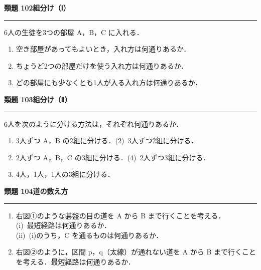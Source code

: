 \documentclass[a4paper,11pt]{ltjsarticle}
\newcommand{\mon}[2]{\Needspace{7\baselineskip}\vspace{10pt}%
  {\sffamily\bfseries 類題 #1\quad #2\par}\vspace{2pt}\hrule\vspace{4pt}}
\begin{document}
\mon{102}{組分け（Ⅰ）}
6人の生徒を3つの部屋 A，B，C に入れる．
\begin{enumerate}
\item 空き部屋があってもよいとき，入れ方は何通りあるか．
\item ちょうど2つの部屋だけを使う入れ方は何通りあるか．
\item どの部屋にも少なくとも1人が入る入れ方は何通りあるか．
\end{enumerate}

\mon{103}{組分け（Ⅱ）}
6人を次のように分ける方法は，それぞれ何通りあるか．
\begin{enumerate}
\item 3人ずつ A，B の2組に分ける．\qquad (2)\ 3人ずつ2組に分ける．
\item[(3)] 2人ずつ A，B，C の3組に分ける．\qquad (4)\ 2人ずつ3組に分ける．
\item[(5)] 4人，1人，1人の3組に分ける．
\end{enumerate}

\mon{104}{道の数え方}
\begin{minipage}[t]{0.6\linewidth}
\begin{enumerate}
\item 右図①のような碁盤の目の道を A から B まで行くことを考える．\\
(i)\ 最短経路は何通りあるか．\\
(ii)\ (i)のうち，C を通るものは何通りあるか．
\item 右図②のように，区間 p，q（太線）が通れない道を A から B まで行くことを考える．最短経路は何通りあるか．
\end{enumerate}
\end{minipage}\hfill
\begin{minipage}[t]{0.38\linewidth}
\vspace{-4pt}
\hspace{6pt}
\end{minipage}
\end{document}
